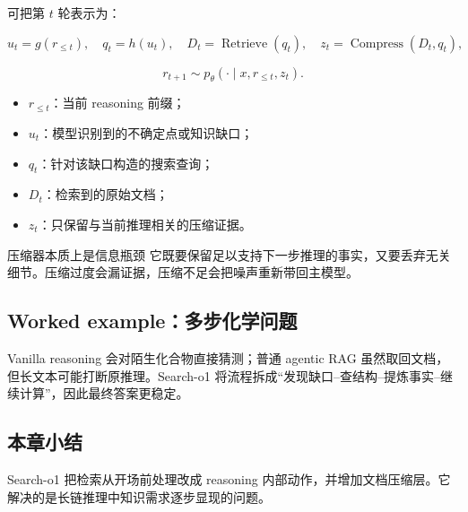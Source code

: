 可把第 $t$ 轮表示为：

$$
u_t=g(r_{\le t}),\quad
q_t=h(u_t),\quad
D_t=\operatorname{Retrieve}(q_t),\quad
z_t=\operatorname{Compress}(D_t,q_t),
$$

$$
r_{t+1}\sim p_\theta(\cdot\mid x,r_{\le t},z_t).
$$

\begin{itemize}
    \item $r_{\le t}$：当前 reasoning 前缀；
    \item $u_t$：模型识别到的不确定点或知识缺口；
    \item $q_t$：针对该缺口构造的搜索查询；
    \item $D_t$：检索到的原始文档；
    \item $z_t$：只保留与当前推理相关的压缩证据。
\end{itemize}



\begin{knowledgebox}{压缩器本质上是信息瓶颈}
它既要保留足以支持下一步推理的事实，又要丢弃无关细节。压缩过度会漏证据，压缩不足会把噪声重新带回主模型。
\end{knowledgebox}

\subsection{Worked example：多步化学问题}


Vanilla reasoning 会对陌生化合物直接猜测；普通 agentic RAG 虽然取回文档，但长文本可能打断原推理。Search-o1 将流程拆成“发现缺口--查结构--提炼事实--继续计算”，因此最终答案更稳定。

\subsection{本章小结}

Search-o1 把检索从开场前处理改成 reasoning 内部动作，并增加文档压缩层。它解决的是长链推理中知识需求逐步显现的问题。

